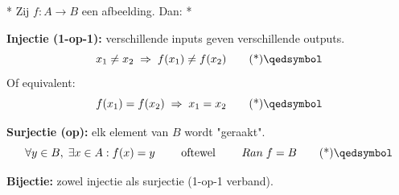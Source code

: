 \begin{nicedefinition}*\label{def:h2_afbeelding}
    Zij $f: A \rightarrow B$ een afbeelding. Dan:
    \nextpart[]*

    \textcolor{PineGreen!75!black}{\textbf{Injectie (1-op-1):}} verschillende inputs geven verschillende outputs.
    \begin{equation}
        x_1 \neq x_2 \; \Rightarrow \; f(x_1) \neq f(x_2) \qedtag
    \end{equation}
    Of equivalent:
    \begin{equation}
        f(x_1) = f(x_2) \; \Rightarrow \; x_1 = x_2 \qedtag
    \end{equation}

    \vspace{0.5cm}

    \textcolor{PineGreen!75!black}{\textbf{Surjectie (op):}} elk element van $B$ wordt "geraakt".
    \begin{equation}
        \forall y \in B, \; \exists x \in A: f(x) = y \qquad
        \text{ oftewel } \qquad Ran \; f = B \qedtag
    \end{equation}

    \vspace{0.5cm}

    \textcolor{PineGreen!75!black}{\textbf{Bijectie:}} zowel injectie als surjectie (1-op-1 verband).
\end{nicedefinition}


